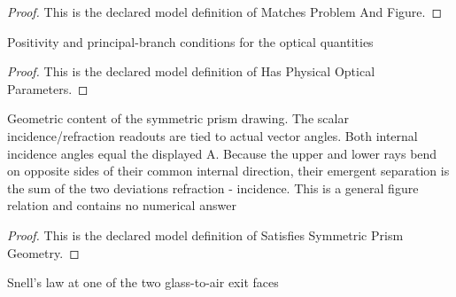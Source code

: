 \begin{proof}
  This is the declared model definition of Matches Problem And Figure.
\end{proof}
\begin{definition}
  \label{def:physics:phyx-mini-0099:phyxminiproblems-problemphyxmini0099-hasphysicalopticalparameters}
  Positivity and principal-branch conditions for the optical quantities
\end{definition}
\begin{proof}
  This is the declared model definition of Has Physical Optical Parameters.
\end{proof}
\begin{definition}
  \label{def:physics:phyx-mini-0099:phyxminiproblems-problemphyxmini0099-satisfiessymmetricprismgeometry}
  Geometric content of the symmetric prism drawing. The scalar incidence/refraction readouts are tied to actual vector angles. Both internal incidence angles equal the displayed A. Because the upper and lower rays bend on opposite sides of their common internal direction, their emergent separation is the sum of the two deviations refraction - incidence. This is a general figure relation and contains no numerical answer
\end{definition}
\begin{proof}
  This is the declared model definition of Satisfies Symmetric Prism Geometry.
\end{proof}
\begin{definition}
  \label{def:physics:phyx-mini-0099:phyxminiproblems-problemphyxmini0099-satisfiessnellslawatexit}
  Snell's law at one of the two glass-to-air exit faces
\end{definition}
